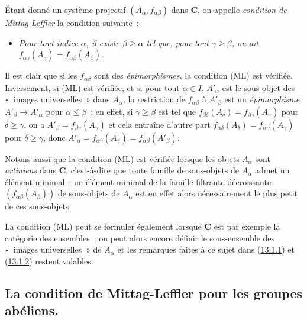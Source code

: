 \begin{env}[13.1.2]
\label{0.13.1.2-fr}
Étant donné un système projectif $(A_\alpha,f_{\alpha\beta})$ dans
$\boldsymbol{C}$, on appelle \emph{condition de Mittag-Leffler} la condition
suivante~:
\begin{itemize}
\item[(ML)]
\emph{Pour tout indice $\alpha$, il existe $\beta\geq\alpha$ tel que, pour
tout $\gamma\geq\beta$, on ait
$f_{\alpha\gamma}(A_\gamma)=f_{\alpha\beta}(A_\beta)$.}
\end{itemize}

Il est clair que si les $f_{\alpha\beta}$ sont des \emph{épimorphismes}, la
condition (ML) est vérifiée. Inversement, si (ML) est vérifiée, et si pour
tout $\alpha\in I$, $A'_\alpha$ est le sous-objet des «~images
universelles~» dans $A_\alpha$, la restriction de $f_{\alpha\beta}$ à
$A'_\beta$ est un \emph{épimorphisme}
$A'_\beta\to A'_\alpha$ pour $\alpha\leq\beta$~: en effet, si
$\gamma\geq\beta$ est tel que
$f_{\beta\delta}(A_\delta)=f_{\beta\gamma}(A_\gamma)$ pour
$\delta\geq\gamma$, on a
$A'_\beta=f_{\beta\gamma}(A_\gamma)$ et cela entraîne d'autre part
$f_{\alpha\delta}(A_\delta)=f_{\alpha\gamma}(A_\gamma)$ pour
$\delta\geq\gamma$, donc
$A'_\alpha=f_{\alpha\gamma}(A_\gamma)=f_{\alpha\beta}(A'_\beta)$.

Notons aussi que la condition (ML) est vérifiée lorsque les objets
$A_\alpha$ sont \emph{artiniens} dans $\boldsymbol{C}$, c'est-à-dire que toute
famille de sous-objets de $A_\alpha$ admet un élément minimal~: un élément
minimal de la famille filtrante décroissante
$(f_{\alpha\beta}(A_\beta))$ de sous-objets de $A_\alpha$ est en effet
alors nécessairement le plus petit de ces sous-objets.
\end{env}

\begin{remark}[13.1.3]
\label{0.13.1.3-fr}
La condition (ML) peut se formuler également lorsque $\boldsymbol{C}$ est par
exemple la catégorie des ensembles~; on peut alors encore définir le
sous-ensemble des «~images universelles~» de $A_\alpha$ et les remarques
faites à ce sujet dans (\hyperref[0.13.1.1-fr]{13.1.1}) et
(\hyperref[0.13.1.2-fr]{13.1.2}) restent valables.
\end{remark}

\subsection{La condition de Mittag-Leffler pour les groupes abéliens.}
\label{subsection:0.13.2-fr}

